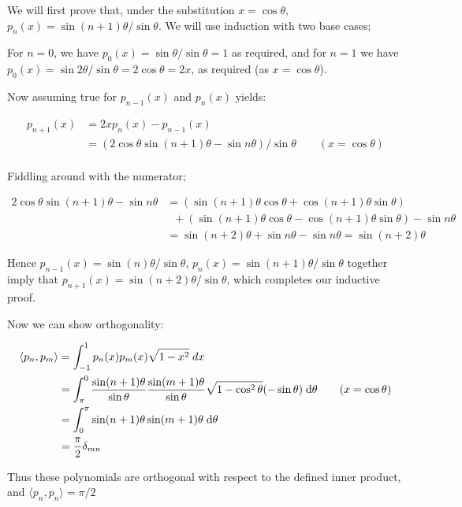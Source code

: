 \documentclass[a4paper]{article}
\begin{document}
We will first prove that, under the substitution $ x = \cos \theta $, $ p_{n}(x) = \sin(n+1) \theta / \sin \theta $. We will use induction with two base cases;

For $ n = 0 $, we have $ p_{0}(x) = \sin \theta / \sin \theta = 1 $ as required, and for $ n = 1 $ we have  $ p_{0}(x) = \sin 2 \theta / \sin \theta = 2 \cos \theta = 2 x $, as required (as $ x = \cos \theta $). 

Now assuming true for $ p_{n-1}(x) $ and $ p_{n}(x) $ yields:

\begin{align*}
p_{n+1}(x) & = 2x p_{n}(x) -p_{n-1}(x) \\
& = (2 \cos \theta \sin(n+1)\theta  - \sin n \theta) / \sin \theta \qquad (x =  \cos \theta ) \\
\end{align*}

Fiddling around with the numerator;

\begin{align*}
2 \cos \theta \sin(n+1)\theta  - \sin n \theta & = ( \sin (n+1) \theta \cos \theta + \cos(n+1 )\theta \sin \theta ) \\
& \; \; + (\sin(n+1)\theta \cos \theta - \cos(n+1) \theta \sin \theta) - \sin n\theta  \\
& = \sin(n+2) \theta + \sin n \theta - \sin n\theta =  \sin(n+2) \theta
\end{align*}

Hence $ p_{n-1}(x) = \sin(n) \theta / \sin \theta $, $ p_{n}(x) = \sin(n+1) \theta / \sin \theta $ together imply that $ p_{n+1}(x) = \sin(n+2) \theta / \sin \theta $, which completes our inductive proof. 

Now we can show orthogonality: 

\begin{align*}
\langle p_{n},p_{m} \rangle & = \int_{-1}^{1} p_{n}(x) p_{m}(x) \sqrt{1-x^{2}}  \; d x \\
& = \int_{\pi}^{0} \frac{\sin(n+1)\theta}{\sin \theta} \frac{\sin(m+1)\theta}{\sin \theta} \sqrt{ 1 - \cos^{2} \theta} ( - \sin \theta) \; \mathrm{d} \theta \qquad (x = \cos \theta) \\
& = \int_{0}^{\pi} \sin(n+1) \theta \sin(m+1) \theta \; \mathrm{d} \theta \\
& = \frac{\pi}{2} \delta_{mn}
\end{align*}

Thus these polynomials are orthogonal with respect to the defined inner product, and $ \langle p_{n},p_{n} \rangle = \pi / 2 $
\end{document}
